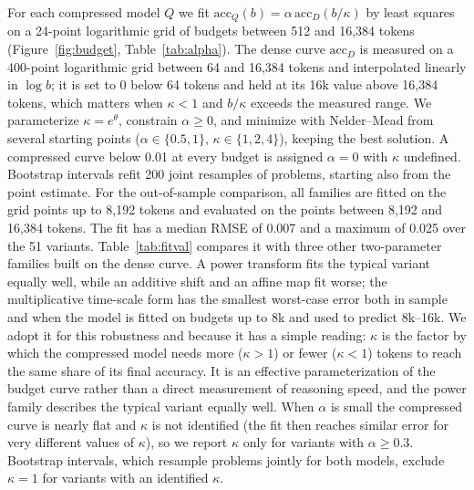 \documentclass[10pt]{article}
\newcommand{\acc}{\mathrm{acc}}
\begin{document}
For each compressed model $Q$ we fit $\acc_Q(b)=\alpha\,\acc_D(b/\kappa)$ by least squares on a 24-point logarithmic grid of budgets between 512 and 16,384 tokens (Figure~\ref{fig:budget}, Table~\ref{tab:alpha}). The dense curve $\acc_D$ is measured on a 400-point logarithmic grid between 64 and 16,384 tokens and interpolated linearly in $\log b$; it is set to 0 below 64 tokens and held at its 16k value above 16,384 tokens, which matters when $\kappa<1$ and $b/\kappa$ exceeds the measured range. We parameterize $\kappa=e^{\theta}$, constrain $\alpha\ge0$, and minimize with Nelder--Mead from several starting points ($\alpha\in\{0.5,1\}$, $\kappa\in\{1,2,4\}$), keeping the best solution. A compressed curve below 0.01 at every budget is assigned $\alpha=0$ with $\kappa$ undefined. Bootstrap intervals refit 200 joint resamples of problems, starting also from the point estimate. For the out-of-sample comparison, all families are fitted on the grid points up to 8,192 tokens and evaluated on the points between 8,192 and 16,384 tokens. The fit has a median RMSE of 0.007 and a maximum of 0.025 over the 51 variants. Table~\ref{tab:fitval} compares it with three other two-parameter families built on the dense curve. A power transform fits the typical variant equally well, while an additive shift and an affine map fit worse; the multiplicative time-scale form has the smallest worst-case error both in sample and when the model is fitted on budgets up to 8k and used to predict 8k--16k. We adopt it for this robustness and because it has a simple reading: $\kappa$ is the factor by which the compressed model needs more ($\kappa>1$) or fewer ($\kappa<1$) tokens to reach the same share of its final accuracy. It is an effective parameterization of the budget curve rather than a direct measurement of reasoning speed, and the power family describes the typical variant equally well. When $\alpha$ is small the compressed curve is nearly flat and $\kappa$ is not identified (the fit then reaches similar error for very different values of $\kappa$), so we report $\kappa$ only for variants with $\alpha\ge0.3$. Bootstrap intervals, which resample problems jointly for both models, exclude $\kappa=1$ for  variants with an identified $\kappa$.

\begin{table}[t]
  \centering\small\setlength{\tabcolsep}{3pt}
  \caption{Two-parameter families fitted to the 51 budget curves: RMSE on the full grid, out-of-sample (OOS) error when fitting on $b\le$8k and predicting $b>$8k, and the number of variants for which each family is best.}
  \label{tab:fitval}
\end{table}
\end{document}
